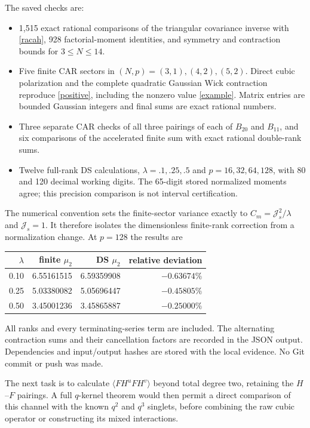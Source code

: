 \documentclass[11pt,a4paper]{article}
\newcommand{\Js}{\mathcal J_s}
\newcommand{\av}[1]{\langle #1\rangle}
\begin{document}
The saved checks are:
\begin{itemize}
\item 1,515 exact rational comparisons of the triangular covariance
inverse with \eqref{racah}, 928 factorial-moment identities, and
symmetry and contraction bounds for $3\leq N\leq14$.
\item Five finite CAR sectors in $(N,p)=(3,1),(4,2),(5,2)$.
Direct cubic polarization and the complete quadratic Gaussian
Wick contraction reproduce \eqref{positive}, including the
nonzero value \eqref{example}. Matrix entries are bounded Gaussian
integers and final sums are exact rational numbers.
\item Three separate CAR checks of all three pairings of each of
$B_{20}$ and $B_{11}$, and six comparisons of the accelerated
finite sum with exact rational double-rank sums.
\item Twelve full-rank DS calculations, $\lambda=.1,.25,.5$ and
$p=16,32,64,128$, with 80 and 120 decimal working digits.
The 65-digit stored normalized moments agree; this precision
comparison is not interval certification.
\end{itemize}
The numerical convention sets the finite-sector variance exactly
to $C_m=\Js^2/\lambda$ and $\Js=1$. It therefore isolates the
dimensionless finite-rank correction from a normalization change.
At $p=128$ the results are
\begin{center}
\begin{tabular}{rrrr}
\toprule
$\lambda$ & finite $\mu_2$ & DS $\mu_2$ & relative deviation\\
\midrule
0.10 & 6.55161515 & 6.59359908 & $-0.63674\%$\\
0.25 & 5.03380082 & 5.05696447 & $-0.45805\%$\\
0.50 & 3.45001236 & 3.45865887 & $-0.25000\%$\\
\bottomrule
\end{tabular}
\end{center}
All ranks and every terminating-series term are included. The
alternating contraction sums and their cancellation factors are
recorded in the JSON output. Dependencies and input/output hashes
are stored with the local evidence. No Git commit or push was made.

The next task is to calculate $\av{FH^uFH^v}$ beyond total degree
two, retaining the $H$--$F$ pairings. A full $q$-kernel theorem
would then permit a direct comparison of this channel with the
known $q^2$ and $q^3$ singlets, before combining the raw cubic
operator or constructing its mixed interactions.
\end{document}
